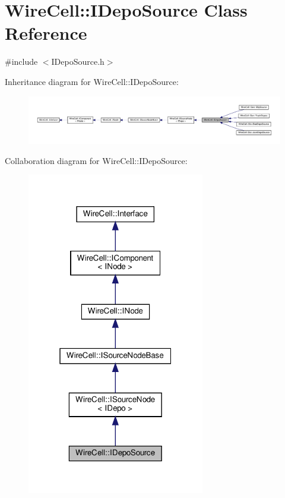 \hypertarget{class_wire_cell_1_1_i_depo_source}{}\section{Wire\+Cell\+:\+:I\+Depo\+Source Class Reference}
\label{class_wire_cell_1_1_i_depo_source}


{\ttfamily \#include $<$I\+Depo\+Source.\+h$>$}



Inheritance diagram for Wire\+Cell\+:\+:I\+Depo\+Source\+:
\nopagebreak
\begin{figure}[H]
\begin{center}
\leavevmode
\includegraphics[width=350pt]{class_wire_cell_1_1_i_depo_source__inherit__graph}
\end{center}
\end{figure}


Collaboration diagram for Wire\+Cell\+:\+:I\+Depo\+Source\+:
\nopagebreak
\begin{figure}[H]
\begin{center}
\leavevmode
\includegraphics[width=220pt]{class_wire_cell_1_1_i_depo_source__coll__graph}
\end{center}
\end{figure}
